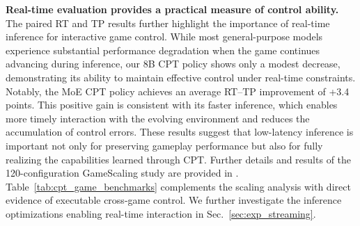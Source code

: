\textbf{Real-time evaluation provides a practical measure of control ability.} The paired RT and TP results further highlight the importance of real-time inference for interactive game control. While most general-purpose models experience substantial performance degradation when the game continues advancing during inference, our 8B CPT policy shows only a modest decrease, demonstrating its ability to maintain effective control under real-time constraints. Notably, the MoE CPT policy achieves an average RT--TP improvement of +3.4 points. This positive gain is consistent with its faster inference, which enables more timely interaction with the evolving environment and reduces the accumulation of control errors. These results suggest that low-latency inference is important not only for preserving gameplay performance but also for fully realizing the capabilities learned through CPT. Further details and results of the 120-configuration GameScaling study are provided in \citet{gamescaling}. Table~\ref{tab:cpt_game_benchmarks} complements the scaling analysis with direct evidence of executable cross-game control. We further investigate the inference optimizations enabling real-time interaction in Sec.~\ref{sec:exp_streaming}.


